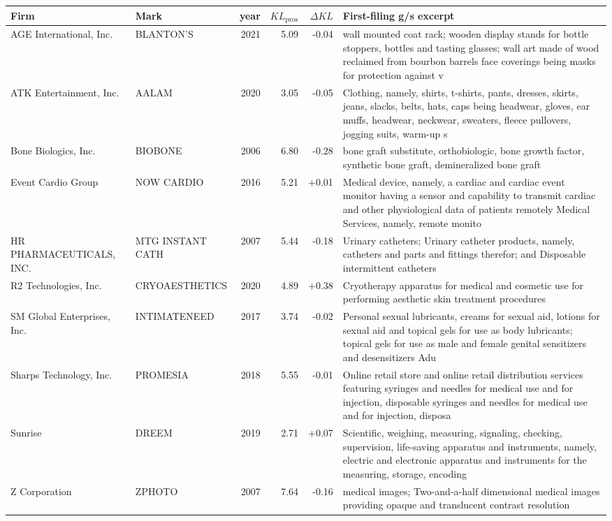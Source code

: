 \begin{tabular}{p{4.0cm}p{2.2cm}rrrp{6.5cm}}
\toprule
Firm & Mark & year & $KL_\text{pros}$ & $\Delta KL$ & First-filing g/s excerpt \\
\midrule
AGE International, Inc. & BLANTON'S & 2021 & 5.09 & -0.04 & wall mounted coat rack; wooden display stands for bottle stoppers, bottles and tasting glasses; wall art made of wood reclaimed from bourbon barrels face coverings being masks for protection against v \\
ATK Entertainment, Inc. & AALAM & 2020 & 3.05 & -0.05 & Clothing, namely, shirts, t-shirts, pants, dresses, skirts, jeans, slacks, belts, hats, caps being headwear, gloves, ear muffs, headwear, neckwear, sweaters, fleece pullovers, jogging suits, warm-up s \\
Bone Biologics, Inc. & BIOBONE & 2006 & 6.80 & -0.28 & bone graft substitute, orthobiologic, bone growth factor, synthetic bone graft, demineralized bone graft \\
Event Cardio Group & NOW CARDIO & 2016 & 5.21 & +0.01 & Medical device, namely, a cardiac and cardiac event monitor having a sensor and capability to transmit cardiac and other physiological data of patients remotely Medical Services, namely, remote monito \\
HR PHARMACEUTICALS, INC. & MTG INSTANT CATH & 2007 & 5.44 & -0.18 & Urinary catheters; Urinary catheter products, namely, catheters and parts and fittings therefor; and Disposable intermittent catheters \\
R2 Technologies, Inc. & CRYOAESTHETICS & 2020 & 4.89 & +0.38 & Cryotherapy apparatus for medical and cosmetic use for performing aesthetic skin treatment procedures \\
SM Global Enterprises, Inc. & INTIMATENEED & 2017 & 3.74 & -0.02 & Personal sexual lubricants, creams for sexual aid, lotions for sexual aid and topical gels for use as body lubricants; topical gels for use as male and female genital sensitizers and desensitizers Adu \\
Sharps Technology, Inc. & PROMESIA & 2018 & 5.55 & -0.01 & Online retail store and online retail distribution services featuring syringes and needles for medical use and for injection, disposable syringes and needles for medical use and for injection, disposa \\
Sunrise & DREEM & 2019 & 2.71 & +0.07 & Scientific, weighing, measuring, signaling, checking, supervision, life-saving apparatus and instruments, namely, electric and electronic apparatus and instruments for the measuring, storage, encoding \\
Z Corporation & ZPHOTO & 2007 & 7.64 & -0.16 & medical images; Two-and-a-half dimensional medical images providing opaque and translucent contrast resolution \\
\bottomrule
\end{tabular}
\clearpage

